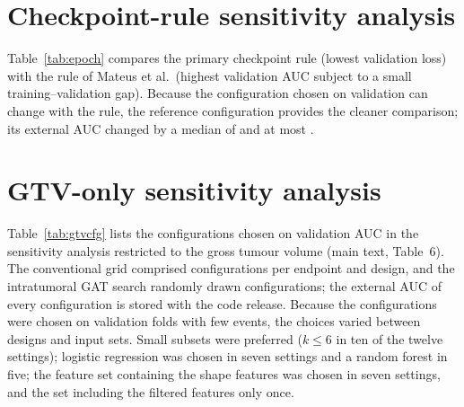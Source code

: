 \documentclass[11pt]{article}
\begin{document}
\section{Checkpoint-rule sensitivity analysis}

Table~\ref{tab:epoch} compares the primary checkpoint rule (lowest validation loss) with the rule of Mateus et al.\ (highest validation AUC subject to a small training--validation gap). Because the configuration chosen on validation can change with the rule, the reference configuration provides the cleaner comparison; its external AUC changed by a median of  and at most .

\begin{table}[!htb]
\centering
\caption{External AUC [95\% CI] of the chosen and reference GATs under the two checkpoint rules.}\label{tab:epoch}
\resizebox{\textwidth}{!}{}
\end{table}

\section{GTV-only sensitivity analysis}

Table~\ref{tab:gtvcfg} lists the configurations chosen on validation AUC in the sensitivity analysis restricted to the gross tumour volume (main text, Table~6). The conventional grid comprised \gtvNcls{} configurations per endpoint and design, and the intratumoral GAT search \gtvNgat{} randomly drawn configurations; the external AUC of every configuration is stored with the code release. Because the configurations were chosen on validation folds with few events, the choices varied between designs and input sets. Small subsets were preferred ($k\leq6$ in ten of the twelve settings); logistic regression was chosen in seven settings and a random forest in five; the feature set containing the shape features was chosen in seven settings, and the set including the filtered features only once.

\begin{table}[!htb]
\centering
\caption{Configurations chosen on validation AUC in the GTV-only sensitivity analysis.}\label{tab:gtvcfg}
\resizebox{\textwidth}{!}{}
\end{table}

\end{document}
